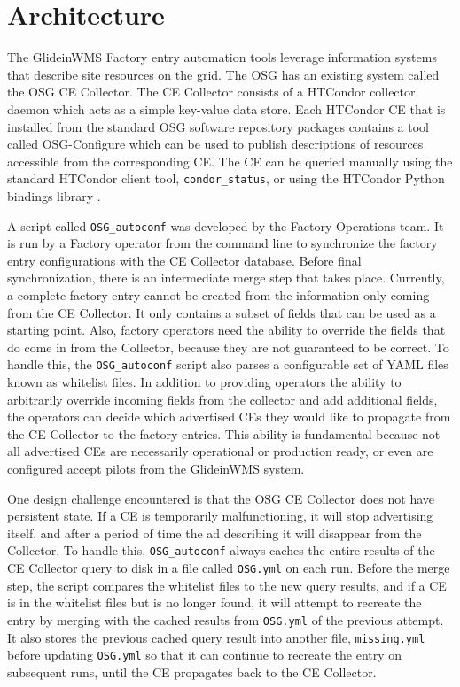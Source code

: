 \documentclass{webofc}
\begin{document}
\section{Architecture}
\label{arch}
The GlideinWMS Factory entry automation tools leverage information systems that describe site resources on the grid. The OSG has an existing system called the OSG CE Collector. The CE Collector consists of a HTCondor collector daemon which acts as a simple key-value data store. Each HTCondor CE that is installed from the standard OSG software repository packages contains a tool called OSG-Configure which can be used to publish descriptions of resources accessible from the corresponding CE. The CE can be queried manually using the standard HTCondor client tool, \verb"condor_status", or using the HTCondor Python bindings library \cite{}. %

A script called \verb"OSG_autoconf" was developed by the Factory Operations team. It is run by a Factory operator from the command line to synchronize the factory entry configurations with the CE Collector database. Before final synchronization, there is an intermediate merge step that takes place. Currently, a complete factory entry cannot be created from the information only coming from the CE Collector. It only contains a subset of fields that can be used as a starting point. Also, factory operators need the ability to override the fields that do come in from the Collector, because they are not guaranteed to be correct. To handle this, the \verb"OSG_autoconf" script also parses a configurable set of YAML files known as whitelist files. In addition to providing operators the ability to arbitrarily override incoming fields from the collector and add additional fields, the operators can decide which advertised CEs they would like to propagate from the CE Collector to the factory entries. This ability is fundamental because not all advertised CEs are necessarily operational or production ready, or even are configured accept pilots from the GlideinWMS system.

One design challenge encountered is that the OSG CE Collector does not have persistent state. If a CE is temporarily malfunctioning, it will stop advertising itself, and after a period of time the ad describing it will disappear from the Collector. To handle this, \verb"OSG_autoconf" always caches the entire results of the CE Collector query to disk in a file called \verb"OSG.yml" on each run. Before the merge step, the script compares the whitelist files to the new query results, and if a CE is in the whitelist files but is no longer found, it will attempt to recreate the entry by merging with the cached results from \verb"OSG.yml" of the previous attempt. It also stores the previous cached query result into another file, \verb"missing.yml" before updating \verb"OSG.yml" so that it can continue to recreate the entry on subsequent runs, until the CE propagates back to the CE Collector.
\end{document}
